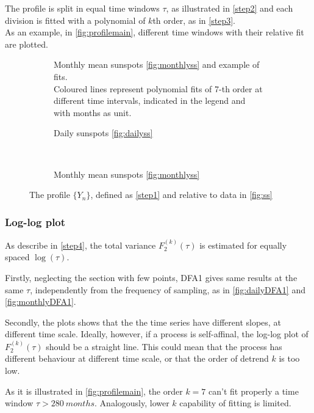The profile is split in equal time windows $\tau$, as illustrated in \autoref{step2} and each division is fitted with a polynomial of $k$th order, as in \autoref{step3}.\\ 
As an example, in \autoref{fig:profilemain}, different time windows with their relative fit are plotted.
\begin{figure}[!h]
	\centering
	\begin{subfigure}{\textwidth}
		
		\caption{Monthly mean sunspots \ref{fig:monthlyss} and example of fits. \\ 
		Coloured lines represent polynomial fits of 7-th order at different time intervals, indicated in the legend and with months as unit.}\label{fig:profilemain}
	\end{subfigure}
	\begin{subfigure}{0.48\textwidth}
		
		\caption{Daily sunspots \ref{fig:dailyss}}\label{fig:dailyprofile}
	\end{subfigure}
	~
	\begin{subfigure}{0.48\textwidth}
		
		\caption{Monthly mean sunspots \ref{fig:monthlyss}}\label{fig:monthlyprofile}
	\end{subfigure}
	\caption{The profile $\{Y_n\}$, defined as \autoref{step1} and relative to data in \autoref{fig:ss}}\label{fig:profile}
\end{figure}

\subsubsection*{Log-log plot}
As describe in \autoref{step4}, the total variance $F_2^{( k )}(\tau)$ is estimated for equally spaced $\log(\tau)$.

Firstly, neglecting the section with few points, DFA1 gives same results at the same $\tau$, independently from the frequency of sampling, as in \autoref{fig:dailyDFA1} and \autoref{fig:monthlyDFA1}.

Secondly, the plots shows that the the time series have different slopes, at different time scale. Ideally, however, if a process is self-affinal, the log-log plot of $F_2^{( k )}(\tau)$ should be a straight line. This could mean that the process has different behaviour at different time scale, or that the order of detrend $k$ is too low.

As it is illustrated in \autoref{fig:profilemain}, the order $k=7$ can't fit properly a time window $\tau > \SI{280}{months}$. Analogously, lower $k$ capability of fitting is limited. 

